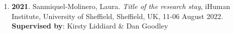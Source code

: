 \begin{enumerate}
\item {\bf 2021}. Sanmiquel-Molinero, Laura. {\it Title of the research stay}, iHuman Institute, University of Sheffield, Sheffield, UK, 11-06 August 2022. {\bf Supervised by}: Kirsty Liddiard \& Dan Goodley\filbreak
\end{enumerate} 
